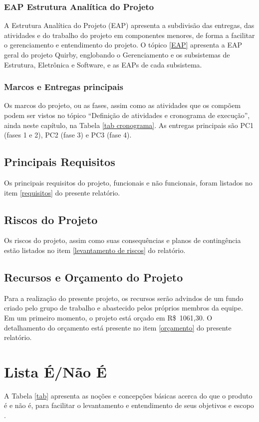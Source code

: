 \begin{apendicesenv}
\subsubsection{EAP Estrutura Analítica do Projeto}
A Estrutura Analítica do Projeto (EAP) apresenta a subdivisão das entregas, das atividades e do trabalho do projeto em componentes menores, de forma a facilitar o gerenciamento e entendimento do projeto. O tópico \ref{EAP} apresenta a  EAP geral do projeto Quirby, englobando o Gerenciamento e os subsistemas de Estrutura, Eletrônica e Software, e as EAPs de cada subsistema.
\subsubsection{Marcos e Entregas principais}
Os marcos do projeto, ou as fases, assim como as atividades que os compõem podem ser vistos no tópico “Definição de atividades e cronograma de execução”, ainda neste capítulo, na Tabela \ref{tab cronograma}. As entregas principais são PC1 (fases 1 e 2), PC2 (fase 3) e PC3 (fase 4). 
\subsection{Principais Requisitos}
Os principais requisitos do projeto, funcionais e não funcionais, foram listados no item \ref{requisitos} do presente relatório.
\subsection{Riscos do Projeto}
Os riscos do projeto, assim como suas consequências e planos de contingência estão listados no item \ref{levantamento de riscos} do relatório.
\subsection{Recursos e Orçamento do Projeto}
Para a realização do presente projeto, os recursos serão advindos de um fundo criado pelo grupo de trabalho e abastecido pelos próprios membros da equipe. Em um primeiro momento, o projeto está orçado em R\$\ 1061,30. O detalhamento do orçamento está presente no item \ref{orçamento} do presente relatório.
\section{Lista É/Não É}
A Tabela \ref{tab} apresenta as noções e concepções básicas acerca do que o produto é e não é, para facilitar o levantamento e entendimento de seus objetivos e escopo \cite{caroli}.


\end{apendicesenv}
